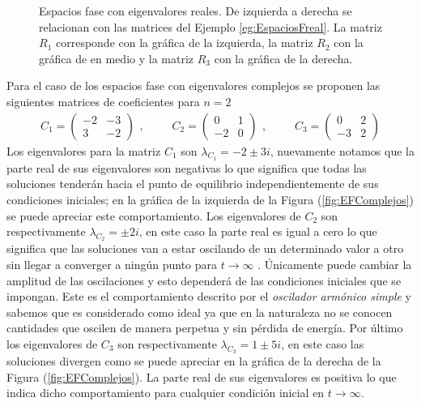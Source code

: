 \begin{ejemplo}
\begin{figure}[h!]
		\caption{Espacios fase con eigenvalores reales. De izquierda a derecha se relacionan con las matrices del Ejemplo \ref{eg:EspaciosFreal}. La matriz $R_1$ corresponde con la gráfica de la izquierda, la matriz $R_2$ con la gráfica de en medio y la matriz $R_3$ con la gráfica de la derecha.}
		\label{fig:EFReales}
	\end{figure}
\end{ejemplo}

\begin{ejemplo}\label{eg:EspaciosFcomplejos}
	Para el caso de los espacios fase con eigenvalores complejos se proponen las siguientes matrices de coeficientes para $n=2$
	\begin{equation*}
		\begin{split}
			C_1=\begin{pmatrix}
				-2 & -3\\
				3 & -2 
			\end{pmatrix}
		\end{split},\qquad
		\begin{split}
			C_2=\begin{pmatrix}
				0 & 1\\
				-2 & 0 			
			\end{pmatrix}
		\end{split},\qquad
		\begin{split}
			C_3=\begin{pmatrix}
				0 & 2\\
				-3 & 2
			\end{pmatrix}
		\end{split}
	\end{equation*}
	Los eigenvalores para la matriz $C_1$ son $\lambda_{C_1}=-2\pm 3i$, nuevamente notamos que la parte real de sus eigenvalores son negativas lo que significa que todas las soluciones tenderán hacia el punto de equilibrio independientemente de sus condiciones iniciales; en la gráfica de la izquierda de la Figura (\ref{fig:EFComplejos}) se puede apreciar este comportamiento. Los eigenvalores de $C_2$ son respectivamente $\lambda_{C_2}=\pm 2i$, en este caso la parte real es igual a cero lo que significa que las soluciones van a estar oscilando de un determinado valor a otro sin llegar a converger a ningún punto para $t\to\infty$ . Únicamente puede cambiar la amplitud de las oscilaciones y esto dependerá de las condiciones iniciales que se impongan. Este es el comportamiento descrito por el \textit{oscilador armónico simple} y sabemos que es considerado como ideal ya que en la naturaleza no se conocen cantidades que oscilen de manera perpetua y sin pérdida de energía. Por último los eigenvalores de $C_3$ son respectivamente $\lambda_{C_3}=1\pm 5i$, en este caso las soluciones divergen como se puede apreciar en la gráfica de la derecha de la Figura (\ref{fig:EFComplejos}). La parte real de sus eigenvalores es positiva lo que indica dicho comportamiento para cualquier condición inicial en $t\to\infty$.

\end{ejemplo}
